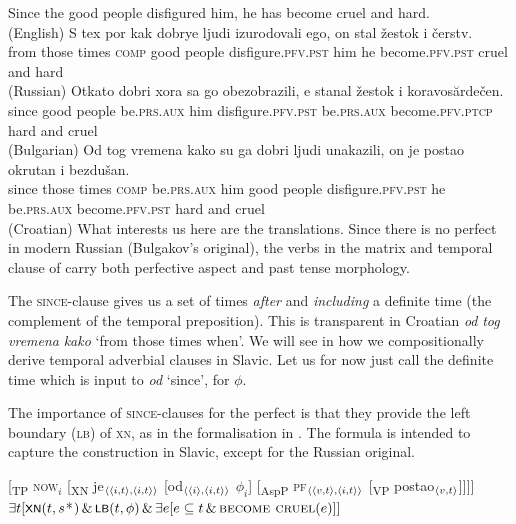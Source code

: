 \documentclass[output=paper,colorlinks,citecolor=brown]{langscibook}
\begin{document}
\ea\ea\label{bulgxn}
 Since the good people disfigured him, he has become cruel and hard.\\\hfill (English)
\ex\label{bulgxn-ru}\gll S tex por kak dobrye ljudi izurodovali ego, on stal žestok i čerstv. \\
from those times \textsc{comp} good people disfigure.\textsc{pfv}.\textsc{pst} him he become.\textsc{pfv}.\textsc{pst} cruel and hard  \\ \hfill (Russian)
\ex\label{bulgxn-bu}\gll Otkato dobri xora sa go obezobrazili, e stanal žestok i koravosărdečen. \\
since good people be.\textsc{prs}.\textsc{aux} him disfigure.\textsc{pfv}.\textsc{pst} be.\textsc{prs}.\textsc{aux} become.\textsc{pfv}.\textsc{ptcp} hard and cruel  \\ \hfill (Bulgarian)
\ex\label{bulgxn-cr}\gll Od tog vremena kako su ga dobri ljudi unakazili, on je postao okrutan i bezdušan. \\
since those times \textsc{comp} be.\textsc{prs}.\textsc{aux} him  good people disfigure.\textsc{pfv}.\textsc{pst} he be.\textsc{prs}.\textsc{aux} become.\textsc{pfv}.\textsc{pst} hard and cruel  \\ \hfill (Croatian) 
\z\z  
What interests us here are the translations. Since there is no perfect in modern Russian (Bulgakov's original), the verbs in the matrix and temporal clause of  carry both perfective aspect and past tense morphology.

The {\textsc{since}}-clause gives us a set of times \textit{after} and \textit{including} a definite time (the complement of the temporal preposition). This is  transparent in Croatian \textit{od} \textit{tog} \textit{vremena} \textit{kako} `from those times when'. We will see in  how we compositionally derive temporal adverbial clauses in Slavic. Let us for now just call the definite time which is input to \textit{od} `since', for $\phi$.

The importance of \textsc{since}-clauses for the perfect is that they provide the left boundary (\textsc{lb}) of \textsc{xn}, as in the formalisation in . The formula is intended to capture the construction in Slavic, except for the  Russian original. 

\ea\label{xn-perf2}\ea
{[}{\textsubscript{TP}} \textsc{now}$_{i}$ [{\textsubscript{XN}} je$_{\langle{\langle{i,t}\rangle,\langle{i,t}\rangle}\rangle}$ [od$_{\langle{\langle{i}\rangle,\langle{i,t}\rangle}\rangle}$ $\phi_{i}$] [{\textsubscript{AspP}} \textsc{pf}$_{\langle{\langle{v,t}\rangle,\langle{i,t}\rangle}\rangle}$ [{\textsubscript{VP}} postao$_{\langle{v,t}\rangle}$]]]] 
\ex $\exists t  [\cnst{xn}(t,s$*$) \, \& \, \cnst{lb}(t,\phi) \, \& \, \exists e[e \subseteq t \, \& \, \textsc{become cruel}(e)]]$
\z\z
\end{document}
